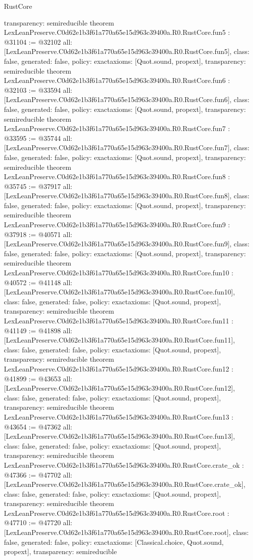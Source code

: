 \begin{lexlean}{RustCore}
\begin{coremodule}
{  transparency: semireducible
}
theorem LexLeanPreserve.C0d62e1b3f61a770a65e15d963c39400a.R0.RustCore.fun5 : @31104 := @32102 {
  all: [LexLeanPreserve.C0d62e1b3f61a770a65e15d963c39400a.R0.RustCore.fun5],
  class: false,
  generated: false,
  policy: exact{axioms: [Quot.sound, propext]},
  transparency: semireducible
}
theorem LexLeanPreserve.C0d62e1b3f61a770a65e15d963c39400a.R0.RustCore.fun6 : @32103 := @33594 {
  all: [LexLeanPreserve.C0d62e1b3f61a770a65e15d963c39400a.R0.RustCore.fun6],
  class: false,
  generated: false,
  policy: exact{axioms: [Quot.sound, propext]},
  transparency: semireducible
}
theorem LexLeanPreserve.C0d62e1b3f61a770a65e15d963c39400a.R0.RustCore.fun7 : @33595 := @35744 {
  all: [LexLeanPreserve.C0d62e1b3f61a770a65e15d963c39400a.R0.RustCore.fun7],
  class: false,
  generated: false,
  policy: exact{axioms: [Quot.sound, propext]},
  transparency: semireducible
}
theorem LexLeanPreserve.C0d62e1b3f61a770a65e15d963c39400a.R0.RustCore.fun8 : @35745 := @37917 {
  all: [LexLeanPreserve.C0d62e1b3f61a770a65e15d963c39400a.R0.RustCore.fun8],
  class: false,
  generated: false,
  policy: exact{axioms: [Quot.sound, propext]},
  transparency: semireducible
}
theorem LexLeanPreserve.C0d62e1b3f61a770a65e15d963c39400a.R0.RustCore.fun9 : @37918 := @40571 {
  all: [LexLeanPreserve.C0d62e1b3f61a770a65e15d963c39400a.R0.RustCore.fun9],
  class: false,
  generated: false,
  policy: exact{axioms: [Quot.sound, propext]},
  transparency: semireducible
}
theorem LexLeanPreserve.C0d62e1b3f61a770a65e15d963c39400a.R0.RustCore.fun10 : @40572 := @41148 {
  all: [LexLeanPreserve.C0d62e1b3f61a770a65e15d963c39400a.R0.RustCore.fun10],
  class: false,
  generated: false,
  policy: exact{axioms: [Quot.sound, propext]},
  transparency: semireducible
}
theorem LexLeanPreserve.C0d62e1b3f61a770a65e15d963c39400a.R0.RustCore.fun11 : @41149 := @41898 {
  all: [LexLeanPreserve.C0d62e1b3f61a770a65e15d963c39400a.R0.RustCore.fun11],
  class: false,
  generated: false,
  policy: exact{axioms: [Quot.sound, propext]},
  transparency: semireducible
}
theorem LexLeanPreserve.C0d62e1b3f61a770a65e15d963c39400a.R0.RustCore.fun12 : @41899 := @43653 {
  all: [LexLeanPreserve.C0d62e1b3f61a770a65e15d963c39400a.R0.RustCore.fun12],
  class: false,
  generated: false,
  policy: exact{axioms: [Quot.sound, propext]},
  transparency: semireducible
}
theorem LexLeanPreserve.C0d62e1b3f61a770a65e15d963c39400a.R0.RustCore.fun13 : @43654 := @47362 {
  all: [LexLeanPreserve.C0d62e1b3f61a770a65e15d963c39400a.R0.RustCore.fun13],
  class: false,
  generated: false,
  policy: exact{axioms: [Quot.sound, propext]},
  transparency: semireducible
}
theorem LexLeanPreserve.C0d62e1b3f61a770a65e15d963c39400a.R0.RustCore.crate_ok : @47366 := @47702 {
  all: [LexLeanPreserve.C0d62e1b3f61a770a65e15d963c39400a.R0.RustCore.crate_ok],
  class: false,
  generated: false,
  policy: exact{axioms: [Quot.sound, propext]},
  transparency: semireducible
}
theorem LexLeanPreserve.C0d62e1b3f61a770a65e15d963c39400a.R0.RustCore.root : @47710 := @47720 {
  all: [LexLeanPreserve.C0d62e1b3f61a770a65e15d963c39400a.R0.RustCore.root],
  class: false,
  generated: false,
  policy: exact{axioms: [Classical.choice, Quot.sound, propext]},
  transparency: semireducible
}


\end{coremodule}
\end{lexlean}
